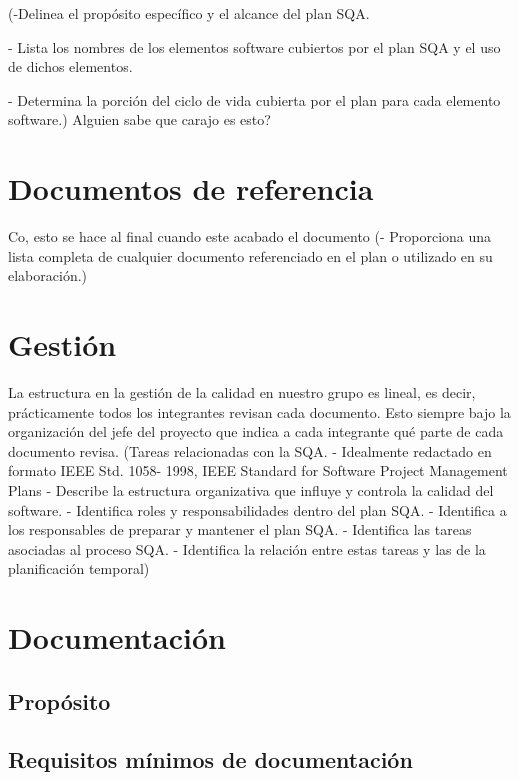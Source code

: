 \documentclass[spanish,a4paper,11pt, twoside]{report}	%
\begin{document}
	(-Delinea el propósito específico y el alcance del plan	SQA.

	- Lista los nombres de los elementos software cubiertos por el plan SQA y el uso de dichos elementos.
		
	- Determina la porción del ciclo de vida cubierta por el plan para cada elemento software.) Alguien sabe que carajo es esto?

\newpage
\mbox{}
\thispagestyle{empty}						%
\newpage

\chapter{ Documentos de referencia}
	Co, esto se hace al final cuando este acabado el documento
	(- Proporciona una lista completa de cualquier documento referenciado en el plan o utilizado en su elaboración.)

\newpage
\mbox{}
\thispagestyle{empty}						%
\newpage

\chapter{ Gestión}%
	La estructura en la gestión de la calidad en nuestro grupo es lineal, es decir, prácticamente todos los integrantes revisan cada documento. Esto siempre bajo la organización del 
	jefe del proyecto que indica a cada integrante qué parte de cada documento revisa. 
	(Tareas relacionadas con la SQA.
	- Idealmente redactado en formato IEEE Std. 1058-
	1998, IEEE Standard for Software Project
	Management Plans
	- Describe la estructura organizativa que influye y
	controla la calidad del software.
	- Identifica roles y responsabilidades dentro del plan
	SQA.
	- Identifica a los responsables de preparar y mantener
	el plan SQA.
	- Identifica las tareas asociadas al proceso SQA.
	- Identifica la relación entre estas tareas y las de la
	planificación temporal)

\newpage
\mbox{}
\thispagestyle{empty}						%
\newpage

\chapter{ Documentación}
	\section{Propósito}
	\section{Requisitos mínimos de documentación}
\end{document}
